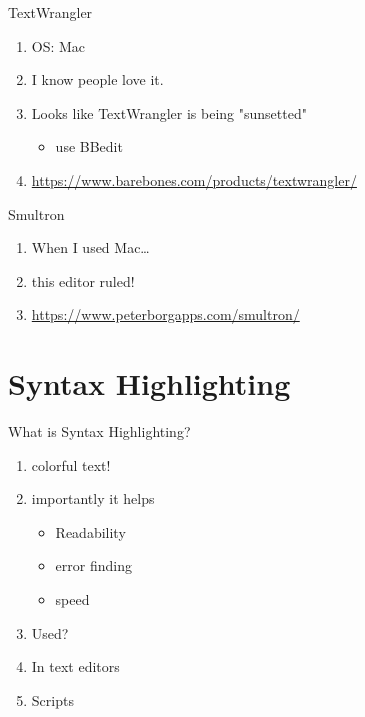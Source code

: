 \documentclass[t,10pt]{beamer}
\begin{document}
\begin{frame}[label={sec:orgheadline12}]{TextWrangler}
\begin{enumerate}[<+->]
\item OS: Mac
\item I know people love it.
\item Looks like TextWrangler is being "sunsetted"
\begin{itemize}
\item use BBedit
\end{itemize}
\item \url{https://www.barebones.com/products/textwrangler/}
\end{enumerate}
\end{frame}

\begin{frame}[label={sec:orgheadline13}]{Smultron}
\begin{enumerate}[<+->]
\item When I used Mac\ldots{}
\item this editor ruled!
\item \url{https://www.peterborgapps.com/smultron/}
\end{enumerate}
\end{frame}

\section{Syntax Highlighting}
\label{sec:orgheadline17}
\begin{frame}[label={sec:orgheadline15}]{What is Syntax Highlighting?}
\begin{enumerate}
\item colorful text!
\item importantly it helps
\begin{itemize}
\item Readability
\item error finding
\item speed
\end{itemize}
\item Used?
\item In text editors
\item Scripts
\end{enumerate}
\end{frame}
\end{document}
